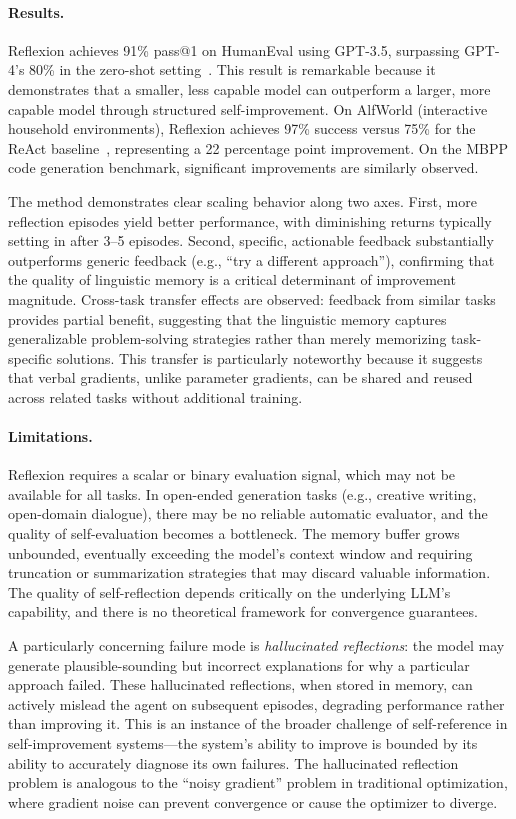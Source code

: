 \paragraph{Results.}
Reflexion achieves 91\% pass@1 on HumanEval using GPT-3.5, surpassing GPT-4's 80\% in the zero-shot setting~\citep{shinn2023reflexion}. This result is remarkable because it demonstrates that a smaller, less capable model can outperform a larger, more capable model through structured self-improvement. On AlfWorld (interactive household environments), Reflexion achieves 97\% success versus 75\% for the ReAct baseline~\citep{yao2022react}, representing a 22 percentage point improvement. On the MBPP code generation benchmark, significant improvements are similarly observed.

The method demonstrates clear scaling behavior along two axes. First, more reflection episodes yield better performance, with diminishing returns typically setting in after 3--5 episodes. Second, specific, actionable feedback substantially outperforms generic feedback (e.g., ``try a different approach''), confirming that the quality of linguistic memory is a critical determinant of improvement magnitude. Cross-task transfer effects are observed: feedback from similar tasks provides partial benefit, suggesting that the linguistic memory captures generalizable problem-solving strategies rather than merely memorizing task-specific solutions. This transfer is particularly noteworthy because it suggests that verbal gradients, unlike parameter gradients, can be shared and reused across related tasks without additional training.

\paragraph{Limitations.}
Reflexion requires a scalar or binary evaluation signal, which may not be available for all tasks. In open-ended generation tasks (e.g., creative writing, open-domain dialogue), there may be no reliable automatic evaluator, and the quality of self-evaluation becomes a bottleneck. The memory buffer grows unbounded, eventually exceeding the model's context window and requiring truncation or summarization strategies that may discard valuable information. The quality of self-reflection depends critically on the underlying LLM's capability, and there is no theoretical framework for convergence guarantees.

A particularly concerning failure mode is \emph{hallucinated reflections}: the model may generate plausible-sounding but incorrect explanations for why a particular approach failed. These hallucinated reflections, when stored in memory, can actively mislead the agent on subsequent episodes, degrading performance rather than improving it. This is an instance of the broader challenge of self-reference in self-improvement systems---the system's ability to improve is bounded by its ability to accurately diagnose its own failures. The hallucinated reflection problem is analogous to the ``noisy gradient'' problem in traditional optimization, where gradient noise can prevent convergence or cause the optimizer to diverge.


